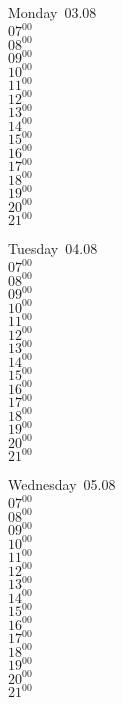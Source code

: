 \documentclass[11pt,a4paper]{book}\usepackage[]{graphicx}\usepackage[]{color}
\begin{document}
\begin{headerbox}
\end{headerbox}
\begin{weekdaybox}
  Monday~03.08\\
  { 
  \vfill
  $07^{00}$\\
$08^{00}$\\
$09^{00}$\\
$10^{00}$\\
$11^{00}$\\
$12^{00}$\\
$13^{00}$\\
$14^{00}$\\
$15^{00}$\\
$16^{00}$\\
$17^{00}$\\
$18^{00}$\\
$19^{00}$\\
$20^{00}$\\
$21^{00}$\\
  }
\end{weekdaybox}
\begin{weekdaybox}
  Tuesday~04.08\\
  { 
  \vfill
  $07^{00}$\\
$08^{00}$\\
$09^{00}$\\
$10^{00}$\\
$11^{00}$\\
$12^{00}$\\
$13^{00}$\\
$14^{00}$\\
$15^{00}$\\
$16^{00}$\\
$17^{00}$\\
$18^{00}$\\
$19^{00}$\\
$20^{00}$\\
$21^{00}$\\
  }
\end{weekdaybox}
\begin{weekdaybox}
  Wednesday~05.08\\
  { 
  \vfill
  $07^{00}$\\
$08^{00}$\\
$09^{00}$\\
$10^{00}$\\
$11^{00}$\\
$12^{00}$\\
$13^{00}$\\
$14^{00}$\\
$15^{00}$\\
$16^{00}$\\
$17^{00}$\\
$18^{00}$\\
$19^{00}$\\
$20^{00}$\\
$21^{00}$\\
  }
\end{weekdaybox}
\end{document}
